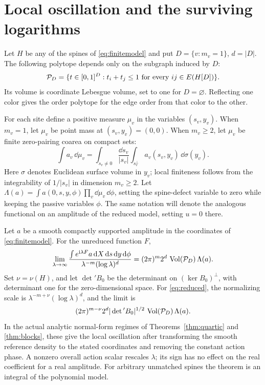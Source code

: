 \section{Local oscillation and the surviving logarithms}\label{sec:osc}

Let \(H\) be any of the spines of \eqref{eq:finitemodel} and put \(D=\{v:m_v=1\}\), \(d=|D|\). The following polytope depends only on the subgraph induced by \(D\):
\begin{equation}\label{eq:polytope}
 {\cal P}_D=\{t\in[0,1]^D:t_i+t_j\le1
                      \text{ for every }ij\in E(H[D])\}.
\end{equation}
Its volume is coordinate Lebesgue volume, set to one for \(D=\varnothing\). Reflecting one color gives the order polytope for the edge order from that color to the other.

For each site define a positive measure \(\mu_v\) in the variables \((s_v,y_v)\). When \(m_v=1\), let \(\mu_v\) be point mass at \((s_v,y_v)=(0,0)\). When \(m_v\ge2\), let \(\mu_v\) be finite zero-pairing coarea on compact sets:
\begin{equation}\label{eq:coarea}
  \int a_v\,\dd\mu_v =
       \int_{s_v\ne0}\frac{\dd s_v}{|s_v|}
            \int_{s_v^\perp}a_v(s_v,y_v)\,\dd\sigma(y_v).
\end{equation}
Here \(\sigma\) denotes Euclidean surface volume in \(y_v\); local finiteness follows from the integrability of \(1/|s_v|\) in dimension \(m_v\ge2\). Let \(\Lambda(a)=\int a(0,s,y,\phi)\prod_v\dd\mu_v\,\dd\phi\), setting the spine-defect variable to zero while keeping the passive variables \(\phi\). The same notation will denote the analogous functional on an amplitude of the reduced model, setting \(u=0\) there.

\begin{theorem}\label{thm:coefficient}
Let \(a\) be a smooth compactly supported amplitude in the coordinates of \eqref{eq:finitemodel}. For the unreduced function \(F\),
\begin{equation}\label{eq:fullasymp}
 \lim_{\lambda\to\infty}
 \frac{\int e^{\mathrm i\lambda F}a\,\mathrm d X\,\mathrm d s\,\mathrm d y\,\mathrm d\phi}
      {\lambda^{-m}(\log\lambda)^d}
       =(2\pi)^m2^d\,\operatorname{Vol}({\cal P}_D)\,\Lambda(a).
\end{equation}
Set \(\nu=\nu(H)\), and let \(\det{}' B_0\) be the determinant on \((\ker B_0)^\perp\), with determinant one for the zero-dimensional space. For \eqref{eq:reduced}, the normalizing scale is \(\lambda^{-m+\nu}(\log\lambda)^d\), and the limit is
\begin{equation}\label{eq:redasymp}
  (2\pi)^{m-\nu}2^d|\det{}' B_0|^{1/2}
                   \,\operatorname{Vol}({\cal P}_D)\,\Lambda(a).
\end{equation}
In the actual analytic normal-form regimes of Theorems~\ref{thm:quartic} and \ref{thm:blocks}, these give the local oscillation after transforming the smooth reference density to the stated coordinates and removing the constant action phase. A nonzero overall action scalar rescales \(\lambda\); its sign has no effect on the real coefficient for a real amplitude. For arbitrary unmatched spines the theorem is an integral of the polynomial model.
\end{theorem}

